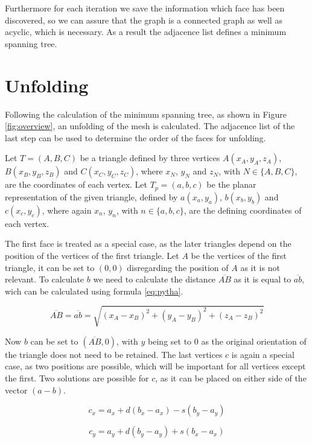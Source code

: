 \documentclass[draft,final]{vutinfth} %
\begin{document}
Furthermore for each iteration we save the information which face has been discovered, so we can assure that the graph is a connected graph as well as acyclic, which is necessary. As a result the adjacence list defines a minimum spanning tree.

\section{Unfolding}

Following the calculation of the minimum spanning tree, as shown in Figure \ref{fig:overview}, an unfolding of the mesh is calculated. The adjacence list of the last step can be used to determine the order of the faces for unfolding.

Let $T = (A,B,C)$ be a triangle defined by three vertices $A(x_A, y_A, z_A)$, $B(x_B, y_B, z_B)$ and $C(x_C, y_C, z_C)$, where $x_N$, $y_N$ and $z_N$, with $N \in \{A,B,C\}$, are the coordinates of each vertex. Let $T_p = (a, b, c)$ be the planar representation of the given triangle, defined by $a(x_a, y_a)$, $b(x_b, y_b)$ and $c(x_c, y_c)$, where again $x_n$, $y_n$, with $n \in \{a,b,c\}$, are the defining coordinates of each vertex.

The first face is treated as a special case, as the later triangles depend on the position of the vertices of the first triangle. Let $A$ be the vertices of the first triangle, it can be set to $(0,0)$ disregarding the position of $A$ as it is not relevant. To calculate $b$ we need to calculate the distance $\overline{AB}$ as it is equal to $\overline{ab}$, wich can be calculated using formula \ref{eq:pytha}.

\begin{equation}
\label{eq:pytha}
\overline{AB} = \overline{ab} = \sqrt{(x_A - x_B)^2 + (y_A - y_B)^2 + (z_A - z_B)^2}
\end{equation}

Now $b$ can be set to $(\overline{AB}, 0)$, with $y$ being set to $0$ as the original orientation of the triangle does not need to be retained. The last vertices $c$ is again a special case, as two positions are possible, which will be important for all vertices except the first. Two solutions are possible for $c$, as it can be placed on either side of the vector $(a-b)$. 

\begin{equation}
\label{eq:cxone}
c_x = a_x + d(b_x - a_x) - s(b_y - a_y)
\end{equation}

\begin{equation}
\label{eq:cyone}
c_y = a_y + d(b_y - a_y) + s(b_x - a_x)
\end{equation}
\end{document}
